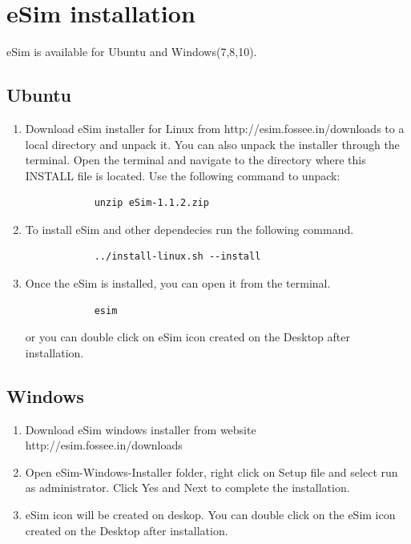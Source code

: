 \documentclass[12pt]{article}
\begin{document}

\newpage

\section{eSim installation}

	eSim is available for Ubuntu and Windows(7,8,10).

\subsection{Ubuntu}
	\begin{enumerate}

		\item Download eSim installer for Linux from http://esim.fossee.in/downloads to
		a local directory and unpack it.
		You can also unpack the installer through the terminal. 
		Open the terminal and navigate to the directory where this INSTALL file is located. 
		Use the following command to unpack:

		\begin{lstlisting}
			unzip eSim-1.1.2.zip 
		\end{lstlisting}

		\item To install eSim and other dependecies run the following command.

		\begin{lstlisting}
			../install-linux.sh --install
		\end{lstlisting}

		\item Once the eSim is installed, you can open it from the terminal.

		\begin{lstlisting}
			esim
		\end{lstlisting}

		or you can double click on eSim icon created on the Desktop after installation.

	\end{enumerate}


\subsection{Windows}
	\begin{enumerate}
		\item Download eSim windows installer from website http://esim.fossee.in/downloads
		\item Open eSim-Windows-Installer folder, right click on Setup file and select run
		as administrator. Click Yes and Next to complete the installation.
		\item eSim icon will be created on deskop. You can double click on the eSim icon
		created on the Desktop after installation.
	\end{enumerate}
\end{document}
